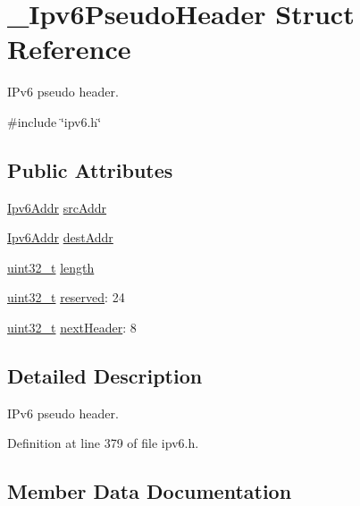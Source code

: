 \hypertarget{struct__Ipv6PseudoHeader}{}\section{\+\_\+\+Ipv6\+Pseudo\+Header Struct Reference}
\label{struct__Ipv6PseudoHeader}


I\+Pv6 pseudo header.  




{\ttfamily \#include \char`\"{}ipv6.\+h\char`\"{}}

\subsection*{Public Attributes}
\begin{DoxyCompactItemize}
\item 
\hyperlink{ipv6_8h_aed0cbc40c61ed5b4fb681ebc55237e89}{Ipv6\+Addr} \hyperlink{struct__Ipv6PseudoHeader_a29f1e9c3b2e08e25956034292ff76059}{src\+Addr}
\item 
\hyperlink{ipv6_8h_aed0cbc40c61ed5b4fb681ebc55237e89}{Ipv6\+Addr} \hyperlink{struct__Ipv6PseudoHeader_ab1eea6425e0b5b2346d499e605dd34cd}{dest\+Addr}
\item 
\hyperlink{stdint_8h_a435d1572bf3f880d55459d9805097f62}{uint32\+\_\+t} \hyperlink{struct__Ipv6PseudoHeader_a2f404792878a64884e2a08d4b9e27ce3}{length}
\item 
\hyperlink{stdint_8h_a435d1572bf3f880d55459d9805097f62}{uint32\+\_\+t} \hyperlink{struct__Ipv6PseudoHeader_a30e349929eb737700fbec226ceb813c4}{reserved}\+: 24
\item 
\hyperlink{stdint_8h_a435d1572bf3f880d55459d9805097f62}{uint32\+\_\+t} \hyperlink{struct__Ipv6PseudoHeader_a44bb4765866ba058758dfc488757befb}{next\+Header}\+: 8
\end{DoxyCompactItemize}


\subsection{Detailed Description}
I\+Pv6 pseudo header. 

Definition at line 379 of file ipv6.\+h.



\subsection{Member Data Documentation}
\mbox{\label{struct__Ipv6PseudoHeader_ab1eea6425e0b5b2346d499e605dd34cd}} 
